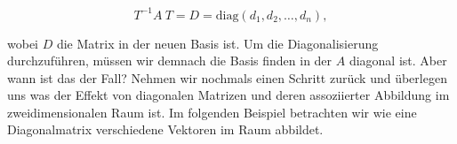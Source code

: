 \begin{equation*}
    T^{-1} A \ T = D = \text{diag}(d_1, d_2, \dots, d_n),
\end{equation*}

wobei \( D \) die Matrix in der neuen Basis ist. Um die Diagonalisierung durchzuführen, müssen wir demnach die Basis finden in der \( A \) diagonal ist. Aber wann ist das der Fall? Nehmen wir nochmals einen Schritt zurück und überlegen uns was der Effekt von diagonalen Matrizen und deren assoziierter Abbildung im zweidimensionalen Raum ist. Im folgenden Beispiel betrachten wir wie eine Diagonalmatrix verschiedene Vektoren im Raum abbildet.

\newpage

\begin{figure}[h]
    \centering

    \begin{tikzpicture}[x=0.75pt,y=0.75pt,yscale=-1,xscale=1]


\end{tikzpicture}
\end{figure}
